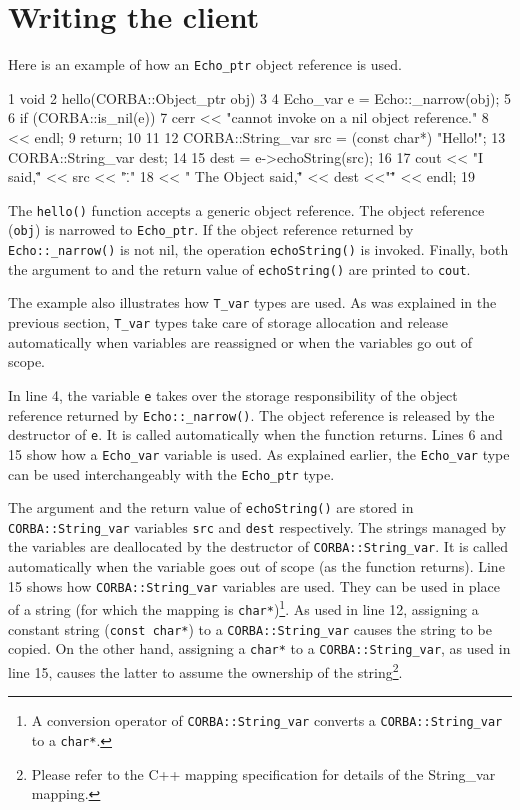 \documentclass[11pt,twoside,a4paper]{book}
\newcommand{\type}[1]{\texttt{#1}}
\newcommand{\code}[1]{\texttt{#1}}
\newcommand{\op}[1]{\texttt{#1()}}
\newcommand{\dsc}{\discretionary{}{}{}}
\begin{document}
\section{Writing the client}

Here is an example of how an \type{Echo\_ptr} object reference is
used.

\lstset{numbers=left,gobble=4}
\begin{cxxlisting}
 1  void
 2  hello(CORBA::Object_ptr obj)
 3  {
 4    Echo_var e = Echo::_narrow(obj);
 5
 6    if (CORBA::is_nil(e)) {
 7      cerr << "cannot invoke on a nil object reference."
 8           << endl;
 9      return;
10    }
11
12    CORBA::String_var src = (const char*) "Hello!";
13    CORBA::String_var dest;
14
15    dest = e->echoString(src);
16
17    cout << "I said,\"" << src << "\"."
18         << " The Object said,\"" << dest <<"\"" << endl;
19  }
\end{cxxlisting}
\lstset{numbers=none,gobble=0}

The \op{hello} function accepts a generic object reference.  The
object reference (\code{obj}) is narrowed to \type{Echo\_ptr}. If the
object reference returned by \op{Echo::\dsc{}\_narrow} is not nil, the
operation \op{echoString} is invoked. Finally, both the argument to
and the return value of \op{echoString} are printed to \code{cout}.

The example also illustrates how \type{T\_var} types are used. As was
explained in the previous section, \type{T\_var} types take care of
storage allocation and release automatically when variables are
reassigned or when the variables go out of scope.

In line 4, the variable \code{e} takes over the storage responsibility
of the object reference returned by \op{Echo::\_narrow}. The object
reference is released by the destructor of \code{e}. It is called
automatically when the function returns. Lines 6 and 15 show how a
\type{Echo\_var} variable is used. As explained earlier, the
\type{Echo\_var} type can be used interchangeably with the
\type{Echo\_ptr} type.

The argument and the return value of \op{echoString} are stored in
\type{CORBA::\dsc{}String\_var} variables \code{src} and \code{dest}
respectively. The strings managed by the variables are deallocated by
the destructor of \type{CORBA::String\_var}. It is called
automatically when the variable goes out of scope (as the function
returns). Line 15 shows how \type{CORBA::String\_var} variables are
used. They can be used in place of a string (for which the mapping is
\type{char*})\footnote{A conversion operator of
\type{CORBA::String\_var} converts a \type{CORBA::\dsc{}String\_var}
to a \type{char*}.}. As used in line 12, assigning a constant string
(\type{const char*}) to a \type{CORBA::String\_var} causes the string
to be copied. On the other hand, assigning a \type{char*} to a
\type{CORBA::String\_var}, as used in line 15, causes the latter to
assume the ownership of the string\footnote{Please refer to the C++
mapping specification for details of the String\_var mapping.}.
\end{document}
